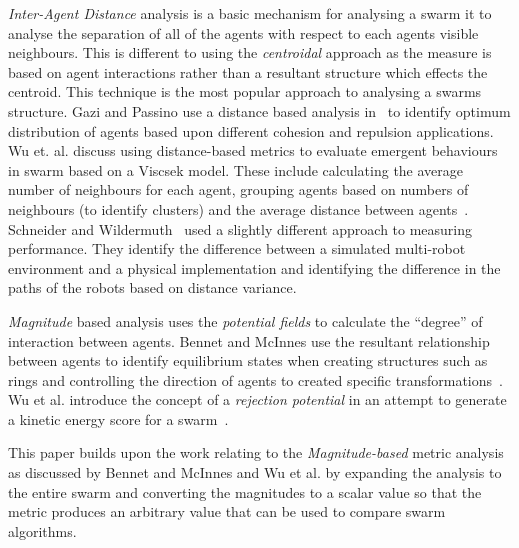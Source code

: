 \documentclass{ieeeaccess}
\begin{document}
\textit{Inter-Agent Distance} analysis is a basic mechanism for analysing a swarm it to analyse the separation of all of the agents with respect to each agents visible neighbours. This is different to using the \textit{centroidal} approach as the measure is based on agent interactions rather than a resultant structure which effects the centroid. This technique is the most popular approach to analysing a swarms structure. Gazi and Passino use a distance based analysis in~\cite{GP:04, GP:11} to identify optimum distribution of agents based upon different cohesion and repulsion applications. Wu et. al. discuss using distance-based metrics to evaluate emergent behaviours in swarm based on a Viscsek model. These include calculating the average number of neighbours for each agent, grouping agents based on numbers of neighbours (to identify clusters) and the average distance between agents~\cite{WCW:11}. Schneider and Wildermuth~\cite{SW:03} used a slightly different approach to measuring performance. They identify the difference between a simulated multi-robot environment and a physical implementation and identifying the difference in the paths of the robots based on distance variance.

\textit{Magnitude} based analysis uses the \textit{potential fields} to calculate the ``degree'' of interaction between agents. Bennet and McInnes use the resultant relationship between agents to identify equilibrium states when creating structures such as rings and controlling the direction of agents to created specific transformations~\cite{BM:09}. Wu et al. introduce the concept of a \textit{rejection potential} in an attempt to generate a kinetic energy score for a swarm~\cite{WCW:11}.

This paper builds upon the work relating to the \textit{Magnitude-based} metric analysis as discussed by Bennet and McInnes and Wu et al. by expanding the analysis to the entire swarm and converting the magnitudes to a scalar value so that the metric produces an arbitrary value that can be used to compare swarm algorithms.

\end{document}
